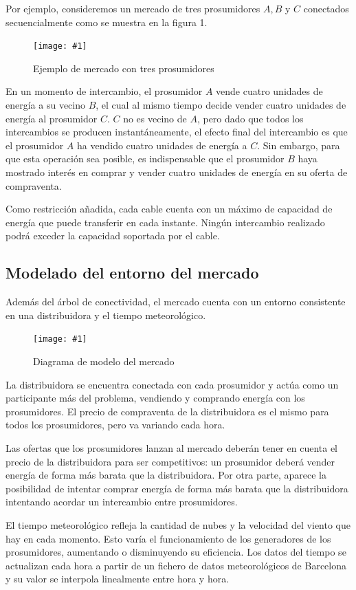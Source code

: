 \documentclass[12pt,a4paper,openright,oneside]{article}
\newcommand{\includeImage}[3]
{
	\begin{figure}[H]
	\begin{center}
	\texttt{[image: \#1]}
	\end{center}
	\caption{#3}
	\end{figure}
}
\numberwithin{equation}{section}
\theoremstyle{definition}
\begin{document}
Por ejemplo, consideremos un mercado de tres prosumidores $A,B$ y $C$ conectados secuencialmente como se muestra en la figura 1.

\includeImage{example_ABC.png}{5}{Ejemplo de mercado con tres prosumidores} 

En un momento de intercambio, el prosumidor $A$ vende cuatro unidades de energía a su vecino $B$, el cual al mismo tiempo decide vender cuatro unidades de energía al prosumidor $C$. $C$ no es vecino de $A$, pero dado que todos los intercambios se producen instantáneamente, el efecto final del intercambio es que el prosumidor $A$ ha vendido cuatro unidades de energía a $C$. Sin embargo, para que esta operación sea posible, es indispensable que el prosumidor $B$ haya mostrado interés en comprar y vender cuatro unidades de energía en su oferta de compraventa.

Como restricción añadida, cada cable cuenta con un máximo de capacidad de energía que puede transferir en cada instante. Ningún intercambio realizado podrá exceder la capacidad soportada por el cable.

\clearpage

\subsection{Modelado del entorno del mercado}

Además del árbol de conectividad, el mercado cuenta con un entorno consistente en una distribuidora y el tiempo meteorológico.

\includeImage{model_market.png}{8}{Diagrama de modelo del mercado}

La distribuidora se encuentra conectada con cada prosumidor y actúa como un participante más del problema, vendiendo y comprando energía con los prosumidores. El precio de compraventa de la distribuidora es el mismo para todos los prosumidores, pero va variando cada hora. 

Las ofertas que los prosumidores lanzan al mercado deberán tener en cuenta el precio de la distribuidora para ser competitivos: un prosumidor deberá vender energía de forma más barata que la distribuidora. Por otra parte, aparece la posibilidad de intentar comprar energía de forma más barata que la distribuidora intentando acordar un intercambio entre prosumidores.

El tiempo meteorológico refleja la cantidad de nubes y la velocidad del viento que hay en cada momento. Esto varía el funcionamiento de los generadores de los prosumidores, aumentando o disminuyendo su eficiencia. Los datos del tiempo se actualizan cada hora a partir de un fichero de datos meteorológicos de Barcelona y su valor se interpola linealmente entre hora y hora.
\end{document}
